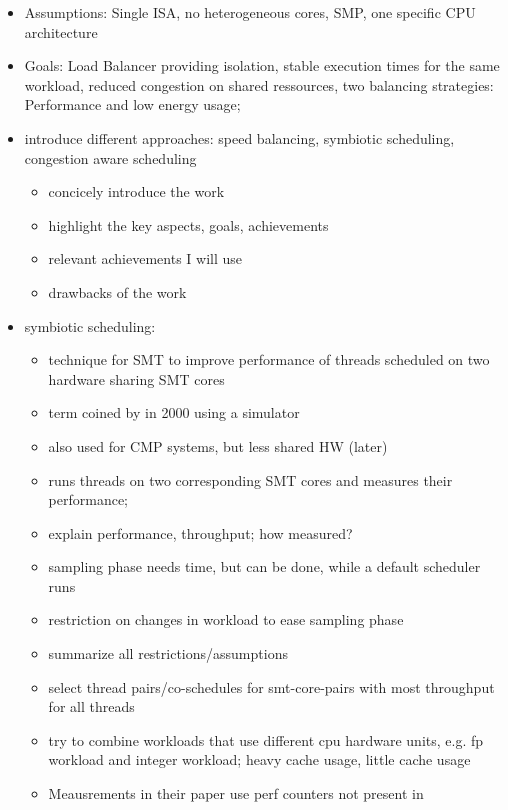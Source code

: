 \begin{itemize}
  \item Assumptions: Single ISA, no heterogeneous cores, SMP, one specific CPU
    architecture
  \item Goals: Load Balancer providing isolation, stable execution times for the
    same workload, reduced congestion on shared ressources, two balancing
    strategies: Performance and low energy usage;
  \item introduce different approaches: speed balancing, symbiotic scheduling,
    congestion aware scheduling

    \begin{itemize}
      \item concicely introduce the work
      \item highlight the key aspects, goals, achievements
      \item relevant achievements I will use
      \item drawbacks of the work
    \end{itemize}
  \item symbiotic scheduling:
    \begin{itemize}
      \item technique for SMT to improve performance of threads scheduled on
	two hardware sharing SMT cores
      \item term coined by \citeauthor{snavely_symbiotic_2002} in 2000 using a
	simulator
      \item also used for CMP systems, but less shared HW (later)
      \item runs threads on two corresponding SMT cores and measures their
	performance;
      \item explain performance, throughput; how measured?
      \item sampling phase needs time, but can be done, while a default
	scheduler runs
      \item restriction on changes in workload to ease sampling phase
      \item summarize all restrictions/assumptions
      \item select thread pairs/co-schedules for smt-core-pairs with most throughput for
	all threads
      \item try to combine workloads that use different cpu hardware
	units, e.g. fp workload and integer workload; heavy cache usage, little
	cache usage
      \item Meausrements in their \citeyear{snavely_symbiotic_2000} paper use perf counters not present in

\end{itemize}
\end{itemize}
